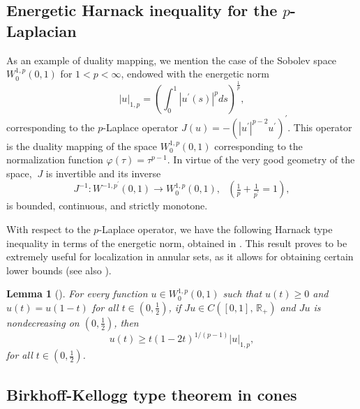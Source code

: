 \documentclass{birkjour}
\newtheorem{lemma}[theorem]{Lemma}
\theoremstyle{definition}
\theoremstyle{remark}
\numberwithin{equation}{section}
\begin{document}
\subsection{Energetic Harnack inequality for the $p$-Laplacian}

As an example of duality mapping, we mention the case of the Sobolev space $%
W_{0}^{1,p}\left( 0,1\right)$ for $1<p<\infty$, endowed with the energetic
norm%
\begin{equation*}
\left\vert u\right\vert _{1,p}=\left( \int_{0}^{1}\left\vert u^{\prime
}\left( s\right) \right\vert ^{p}ds\right) ^{\frac{1}{p}},
\end{equation*}%
corresponding to the $p$-Laplace operator $J\left( u\right) =-\left(
\left\vert u^{\prime }\right\vert ^{p-2}u^{\prime }\right) ^{\prime }.$ This
operator is the duality mapping of the space $W_{0}^{1,p}\left( 0,1\right) $
corresponding to the normalization function $\varphi \left( \tau \right)
=\tau ^{p-1}.$ In virtue of the very good geometry of the space, $\ J$ is
invertible and its inverse
\begin{equation*}
J^{-1}:W^{-1,p^{\prime }}(0,1)\rightarrow W_{0}^{1,p}\left( 0,1\right), \ \
\ \left( \tfrac{1}{p}+\tfrac{1}{p^\prime}=1\right),
\end{equation*}%
is bounded, continuous, and strictly monotone.

With respect to the $p$-Laplace operator, we have the following Harnack type
inequality in terms of the energetic norm, obtained in \cite{lpv}. This
result proves to be extremely useful for localization in annular sets, as it
allows for obtaining certain lower bounds (see also \cite{ppv}).

\begin{lemma}[{\protect\cite[Lemma 3.1]{lpv}}]
\label{Harnack} For every function $u\in W_{0}^{1,p}(0,1)$ such that $%
u(t)\geq 0$ and $u(t)=u(1-t)$ for all $t\in \left( 0,\frac{1}{2}\right) $,
if $Ju\in C([0,1],\,\mathbb{R}_{+})$ and $Ju$ is nondecreasing on $\left( 0,%
\frac{1}{2}\right) $, then
\begin{equation}
u(t)\geq t(1-2t)^{1/(p-1)}|u|_{1,p},  \label{ih}
\end{equation}%
for all $t\in \left( 0,\frac{1}{2}\right) $.
\end{lemma}

\subsection{Birkhoff-Kellogg type theorem in cones}
\end{document}
